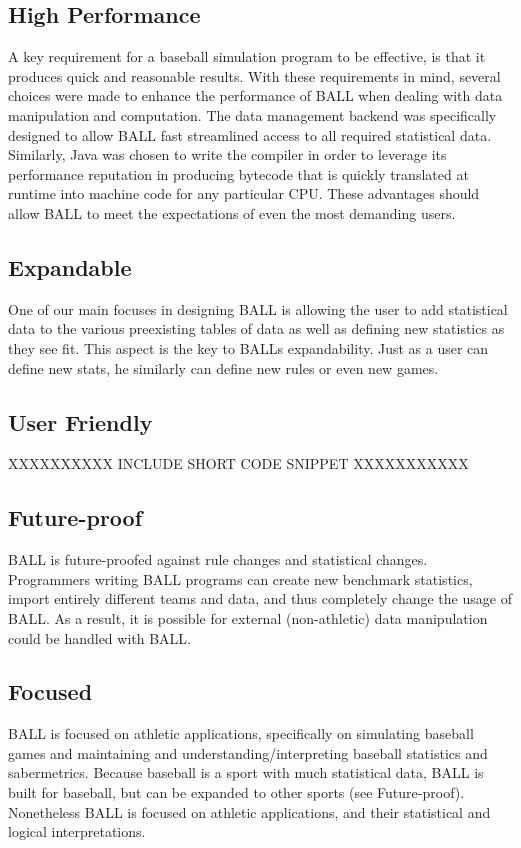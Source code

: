 \subsection{High Performance}
A key requirement for a baseball simulation program to be effective, is that it produces quick and reasonable results. With these requirements in mind, several choices were made to enhance the performance of BALL when dealing with data manipulation and computation. The data management backend was specifically designed to allow BALL fast streamlined access to all required statistical data. Similarly, Java was chosen to write the compiler in order to leverage its performance reputation in producing bytecode that is quickly translated at runtime into machine code for any particular CPU. These advantages should allow BALL to meet the expectations of even the most demanding users.

\subsection{Expandable}
One of our main focuses in designing BALL is allowing the user to add statistical data to the various preexisting tables of data as well as defining new statistics as they see fit. This aspect is the key to BALLs expandability. Just as a user can define new stats, he similarly can define new rules or even new games.

\subsection{User Friendly}
XXXXXXXXXX  
INCLUDE SHORT CODE SNIPPET
XXXXXXXXXXX

\subsection{Future-proof}
BALL is future-proofed against rule changes and statistical changes. Programmers writing BALL programs can create new benchmark statistics, import entirely different teams and data, and thus completely change the usage of BALL. As a result, it is possible for external (non-athletic) data manipulation could be handled with BALL.

\subsection{Focused}
BALL is focused on athletic applications, specifically on simulating baseball games and maintaining and understanding/interpreting baseball statistics and sabermetrics. Because baseball is a sport with much statistical data, BALL is built for baseball, but can be expanded to other sports (see Future-proof). Nonetheless BALL is focused on athletic applications, and their statistical and logical interpretations.

